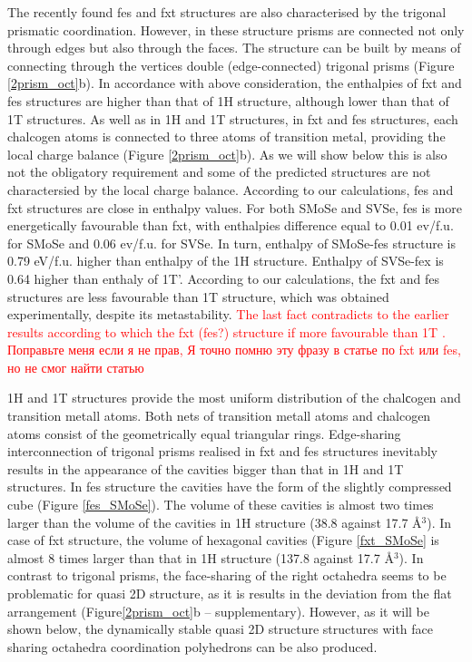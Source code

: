 \documentclass[a4paperm]{article}
\begin{document}
The recently found fes and fxt structures are also characterised by the trigonal prismatic coordination.
However, in these structure prisms are connected not only through edges but also through the faces.
The structure can be built by means of connecting through the vertices double (edge-connected) trigonal prisms (Figure \ref{2prism_oct}b).
In accordance with above consideration, the enthalpies of fxt and fes structures are higher than that of 1H structure, although lower than that of 1T structures.
As well as in 1H and 1T structures, in fxt and fes structures,  each chalcogen atoms is connected to three atoms of transition metal, providing the local charge balance (Figure \ref{2prism_oct}b).
As we will show below this is also not the obligatory requirement and some of the predicted structures are not charactersied by the local charge balance.
According to our calculations, fes and fxt structures are close in enthalpy values.
For both SMoSe and SVSe, fes is more energetically favourable than fxt, with enthalpies difference equal to 0.01 ev/f.u. for SMoSe and 0.06 ev/f.u. for SVSe.
In turn, enthalpy of SMoSe-fes structure is 0.79 eV/f.u. higher than enthalpy of the 1H structure.
Enthalpy of SVSe-fex is 0.64 higher than enthaly of 1T'.
According to our calculations, the fxt and fes structures are less favourable than 1T structure, which was obtained experimentally, despite its metastability.
\textcolor{red}{The last fact contradicts to the earlier results according to which the fxt (fes?) structure if more favourable than 1T \cite{}. Поправьте меня если я не прав, Я точно помню эту фразу в статье по fxt или fes, но не смог найти статью}

1H and 1T structures provide the most uniform distribution of the chalсogen and transition metall atoms. 
Both nets of transition metall atoms and chalcogen atoms consist of the geometrically equal triangular rings.
Edge-sharing interconnection of trigonal prisms realised in fxt and fes structures inevitably results in the appearance of the cavities bigger than that in 1H and 1T structures. 
In fes structure the cavities have the form of the slightly compressed cube (Figure \ref{fes_SMoSe}).
The volume of these cavities is almost two times larger than the volume of the cavities in 1H structure (38.8 against 17.7 \AA$^3$).
In case of fxt structure, the volume of hexagonal cavities (Figure \ref{fxt_SMoSe} is almost 8 times larger than that in 1H structure (137.8 against 17.7 \AA$^3$).
In contrast to trigonal prisms, the face-sharing of the right octahedra seems to be problematic for quasi 2D structure, as it is results in the deviation from the flat arrangement (Figure\ref{2prism_oct}b -- supplementary).
However, as it will be shown below, the dynamically stable quasi 2D structure structures with face sharing octahedra coordination polyhedrons can be also produced.
\end{document}
